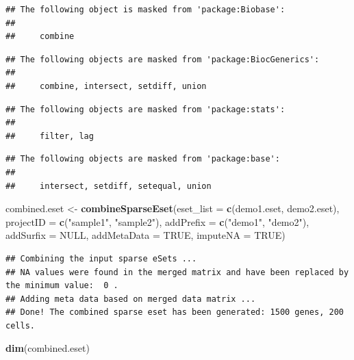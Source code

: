 \documentclass[
  12pt,
]{book}
\newenvironment{Shaded}{\begin{snugshade}}{\end{snugshade}}
\newcommand{\AttributeTok}[1]{\textcolor[rgb]{0.13,0.29,0.53}{#1}}
\newcommand{\ConstantTok}[1]{\textcolor[rgb]{0.56,0.35,0.01}{#1}}
\newcommand{\FunctionTok}[1]{\textcolor[rgb]{0.13,0.29,0.53}{\textbf{#1}}}
\newcommand{\NormalTok}[1]{#1}
\newcommand{\OtherTok}[1]{\textcolor[rgb]{0.56,0.35,0.01}{#1}}
\newcommand{\StringTok}[1]{\textcolor[rgb]{0.31,0.60,0.02}{#1}}
\begin{document}
\begin{verbatim}
## The following object is masked from 'package:Biobase':
## 
##     combine
\end{verbatim}

\begin{verbatim}
## The following objects are masked from 'package:BiocGenerics':
## 
##     combine, intersect, setdiff, union
\end{verbatim}

\begin{verbatim}
## The following objects are masked from 'package:stats':
## 
##     filter, lag
\end{verbatim}

\begin{verbatim}
## The following objects are masked from 'package:base':
## 
##     intersect, setdiff, setequal, union
\end{verbatim}

\begin{Shaded}
\begin{Highlighting}[]
\NormalTok{combined.eset }\OtherTok{\textless{}{-}} \FunctionTok{combineSparseEset}\NormalTok{(}\AttributeTok{eset\_list =} \FunctionTok{c}\NormalTok{(demo1.eset, demo2.eset),}
                                   \AttributeTok{projectID =} \FunctionTok{c}\NormalTok{(}\StringTok{"sample1"}\NormalTok{, }\StringTok{"sample2"}\NormalTok{),}
                                   \AttributeTok{addPrefix =} \FunctionTok{c}\NormalTok{(}\StringTok{"demo1"}\NormalTok{, }\StringTok{"demo2"}\NormalTok{),}
                                   \AttributeTok{addSurfix =} \ConstantTok{NULL}\NormalTok{, }\AttributeTok{addMetaData =} \ConstantTok{TRUE}\NormalTok{, }\AttributeTok{imputeNA =} \ConstantTok{TRUE}\NormalTok{)}
\end{Highlighting}
\end{Shaded}

\begin{verbatim}
## Combining the input sparse eSets ...
## NA values were found in the merged matrix and have been replaced by the minimum value:  0 .
## Adding meta data based on merged data matrix ...
## Done! The combined sparse eset has been generated: 1500 genes, 200 cells.
\end{verbatim}

\begin{Shaded}
\begin{Highlighting}[]
\FunctionTok{dim}\NormalTok{(combined.eset)}
\end{Highlighting}
\end{Shaded}
\end{document}
